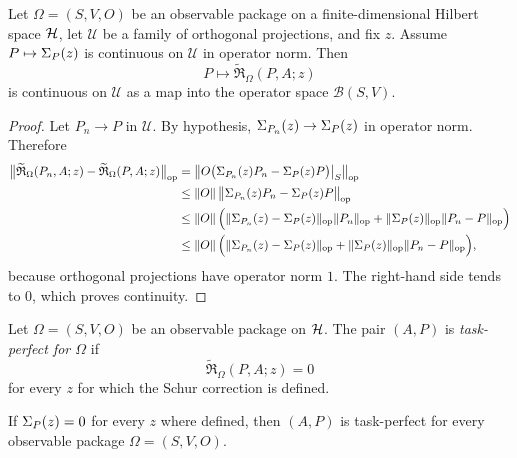 \begin{proposition}
\label{prop:fixed-source-return-continuity}
Let \(\Omega=(S,V,O)\) be an observable package on a finite-dimensional
Hilbert space \(\mathcal{H}\), let \(\mathcal U\) be a family of orthogonal
projections, and fix \(z\). Assume \(P\mapsto \Sigma_{P}(z)\) is continuous
on \(\mathcal U\) in operator norm. Then
\[
P\longmapsto \widetilde{\mathfrak R}_{\Omega}(P,A;z)
\]
is continuous on \(\mathcal U\) as a map into the operator space
\(\mathcal B(S,V)\).
\end{proposition}

\begin{proof}
Let \(P_n\to P\) in \(\mathcal U\). By hypothesis,
\(\Sigma_{P_n}(z)\to \Sigma_{P}(z)\) in operator norm. Therefore
\begin{align*}
\bigl\|
\widetilde{\mathfrak R}_{\Omega}(P_n,A;z)
-\widetilde{\mathfrak R}_{\Omega}(P,A;z)
\bigr\|_{\mathrm{op}}
&=
\bigl\|
O\bigl(\Sigma_{P_n}(z)P_n-\Sigma_{P}(z)P\bigr)\big|_S
\bigr\|_{\mathrm{op}} \\
&\le
\|O\|\,
\bigl\|
\Sigma_{P_n}(z)P_n-\Sigma_{P}(z)P
\bigr\|_{\mathrm{op}} \\
&\le
\|O\|\,
\Bigl(
\|\Sigma_{P_n}(z)-\Sigma_{P}(z)\|_{\mathrm{op}}\|P_n\|_{\mathrm{op}}
+ \|\Sigma_{P}(z)\|_{\mathrm{op}}\|P_n-P\|_{\mathrm{op}}
\Bigr) \\
&\le
\|O\|\,
\Bigl(
\|\Sigma_{P_n}(z)-\Sigma_{P}(z)\|_{\mathrm{op}}
+ \|\Sigma_{P}(z)\|_{\mathrm{op}}\|P_n-P\|_{\mathrm{op}}
\Bigr),
\end{align*}
because orthogonal projections have operator norm \(1\). The right-hand side
tends to \(0\), which proves continuity.
\end{proof}

\begin{definition}
\label{def:task-perfect-coherence}
Let \(\Omega=(S,V,O)\) be an observable package on \(\mathcal{H}\). The pair
\((A,P)\) is \emph{task-perfect for \(\Omega\)} if
\[
\widetilde{\mathfrak R}_{\Omega}(P,A;z)=0
\]
for every \(z\) for which the Schur correction is defined.
\end{definition}

\begin{corollary}
\label{cor:perfect-implies-task-perfect}
If \(\Sigma_{P}(z)=0\) for every \(z\) where defined, then \((A,P)\) is
task-perfect for every observable package \(\Omega=(S,V,O)\).
\end{corollary}

